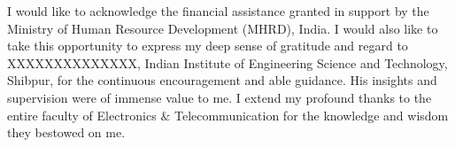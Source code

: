 \justify
\quad 
I would like to acknowledge the financial assistance granted in support by the Ministry of Human Resource Development (MHRD), India. I would also like to take this opportunity to express my deep sense of gratitude and regard to XXXXXXXXXXXXXX, Indian Institute of Engineering Science and Technology, Shibpur, for the continuous encouragement and able guidance. His insights and supervision were of immense value to me. I extend my profound thanks to the entire faculty of Electronics $\&$ Telecommunication for the knowledge and wisdom they bestowed on me.
\newpage